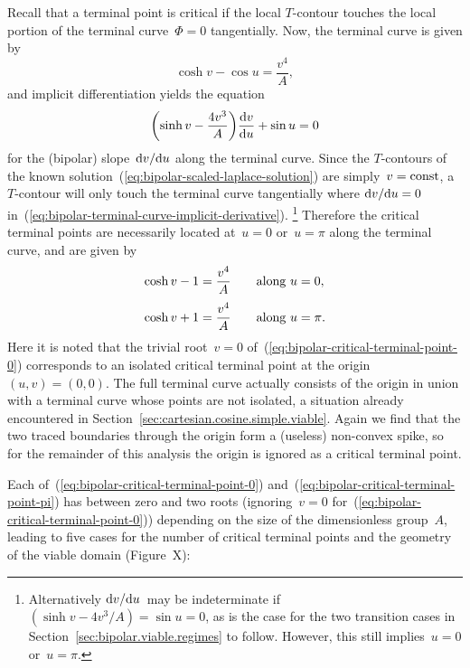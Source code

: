 Recall that a terminal point is critical
if the local $T$-contour touches
the local portion of the terminal curve~$\Phi = 0$ tangentially.
Now, the terminal curve is given by
\begin{equation}
  \cosh v - \cos u = \frac{v^4}{A},
  \label{eq:bipolar-terminal-curve}
\end{equation}
and implicit differentiation yields the equation
\begin{equation}
  \roundbr*{\sinh v - \frac{4 v^3}{A}} \tder{v}{u} + \sin u = 0
  \label{eq:bipolar-terminal-curve-implicit-derivative}
\end{equation}
for the (bipolar) slope~$\mathop{}\!\mathrm{d} v / {\mathop{}\!\mathrm{d} u}$
along the terminal curve.
Since the $T$-contours
of the known solution~(\ref{eq:bipolar-scaled-laplace-solution})
are simply~$v = \mathrm{const}$,
a $T$-contour will only touch the terminal curve tangentially
where $\mathop{}\!\mathrm{d} v / {\mathop{}\!\mathrm{d} u} = 0$
in~(\ref{eq:bipolar-terminal-curve-implicit-derivative}).%
\footnote{
  Alternatively $\mathop{}\!\mathrm{d} v / {\mathop{}\!\mathrm{d} u}$~may be indeterminate
  if~$(\sinh v - 4 v^3 / A) = \sin u = 0$,
  as is the case for the two transition cases
  in Section~\ref{sec:bipolar.viable.regimes} to follow.
  However, this still implies~$u = 0$ or~$u = \pi$.
}
Therefore the critical terminal points are necessarily located
at~$u = 0$ or~$u = \pi$ along the terminal curve,
and are given by
\begin{align}
  \cosh v - 1 &= \frac{v^4}{A} \eqnspace \text{along~$u = 0$},
  \label{eq:bipolar-critical-terminal-point-0}
    \\[\tallspace]
  \cosh v + 1 &= \frac{v^4}{A} \eqnspace \text{along~$u = \pi$}.
  \label{eq:bipolar-critical-terminal-point-pi}
\end{align}
Here it is noted that the trivial root~$v = 0$
of~(\ref{eq:bipolar-critical-terminal-point-0})
corresponds to an isolated critical terminal point
at the origin~$(u, v) = (0, 0)$.
The full terminal curve actually consists of the origin
in union with a  terminal curve
whose points are not isolated,
a situation already encountered
in Section~\ref{sec:cartesian.cosine.simple.viable}.
Again we find that the two traced boundaries through the origin
form a (useless) non-convex spike,
so for the remainder of this analysis
the origin is ignored as a critical terminal point.

Each of~(\ref{eq:bipolar-critical-terminal-point-0})
and~(\ref{eq:bipolar-critical-terminal-point-pi})
has between zero and two roots
(ignoring~$v = 0$ for~(\ref{eq:bipolar-critical-terminal-point-0}))
depending on the size of the dimensionless group~$A$,
leading to five cases for the number of critical terminal points
and the geometry of the viable domain
(Figure~X): %

